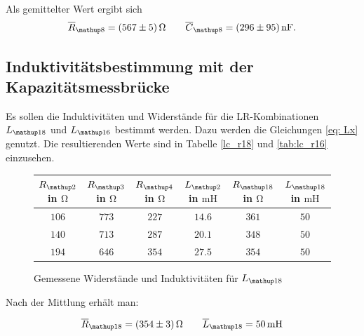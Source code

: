 Als gemittelter Wert ergibt sich
\begin{equation}
\label{eq:wert_r8_c_8}
\overline{R}_{\map{8}}=\SI{567\pm5}{\ohm} \qquad \overline{C}_{\map{8}}=\SI{296\pm95}{\nano\farad}.
\end{equation}

\subsection{Induktivitätsbestimmung mit der Kapazitätsmessbrücke}

Es sollen die Induktivitäten und Widerstände für die LR-Kombinationen $L\ua{18}$ und
$L\ua{16}$ bestimmt werden. Dazu werden die Gleichungen \eqref{eq: Lx} genutzt.
Die resultierenden Werte sind in Tabelle \ref{lc_r18} und \ref{tab:lc_r16} einzusehen. %

\begin{figure}
\centering
\caption{Gemessene Widerstände und Induktivitäten für $L\ua{18}$}
  \label{tab:lc_r18}
\begin{tabular}{S S S S S S }
    \toprule
    {$R\ua{2}$ in $\si{\ohm}$} &  {$R\ua{3}$ in $\si{\ohm}$} & {$R\ua{4}$ in $\si{\ohm}$} & {$L\ua{2}$ in $\si{\milli\henry}$}& {$R\ua{18}$ in $\si{\ohm}$} &  {$L\ua{18}$ in $\si{\milli\henry}$} \\
    \midrule
     {$\num{106}$} & {$\num{773}$} &  {$\num{227}$}& {$\num{14,6}$}  &  {$\num{361}$} & {$\num{50}$}\\
     {$\num{140}$} & {$\num{713}$}  & {$\num{287}$} & {$\num{20,1}$} & {$\num{348}$} & {$\num{50}$}\\
     {$\num{194}$} & {$\num{646}$}  & {$\num{354}$} & {$\num{27,5}$} &{$\num{354}$} & {$\num{50}$}  \\
    \bottomrule
  \end{tabular}
 \end{figure}
Nach der Mittlung erhält man:

\begin{equation}
\label{eq:wert_r18_l_18}
\overline{R}_{\map{18}}=\SI{354\pm3}{\ohm} \qquad \overline{L}_{\map{18}}=\SI{50}{\milli\henry}
\end{equation}


